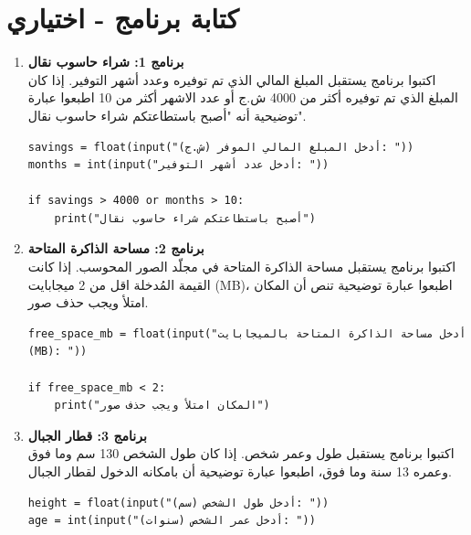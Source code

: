 \documentclass[14pt]{extarticle}
\begin{document}
\section*{كتابة برنامج - اختياري}
\begin{enumerate}[itemsep=3em]

\item \textbf{برنامج 1: شراء حاسوب نقال} \\
اكتبوا برنامج يستقبل المبلغ المالي الذي تم توفيره وعدد أشهر التوفير. إذا كان المبلغ الذي تم توفيره أكثر من 4000 ش.ج أو عدد الاشهر أكثر من 10 اطبعوا عبارة توضيحية أنه "أصبح باستطاعتكم شراء حاسوب نقال".

\ifwithsols
\begin{boxSolution}
\begin{english}
\begin{verbatim}
savings = float(input("أدخل المبلغ المالي الموفر (ش.ج): "))
months = int(input("أدخل عدد أشهر التوفير: "))

if savings > 4000 or months > 10:
    print("أصبح باستطاعتكم شراء حاسوب نقال")
\end{verbatim}
\end{english}
\end{boxSolution}
\fi

\item \textbf{برنامج 2: مساحة الذاكرة المتاحة} \\
اكتبوا برنامج يستقبل مساحة الذاكرة المتاحة في مجلّد الصور المحوسب. إذا كانت القيمة المُدخلة اقل من 2 ميجابايت (\textenglish{MB})، اطبعوا عبارة توضيحية تنص أن المكان امتلأ ويجب حذف صور.

\ifwithsols
\begin{boxSolution}
\begin{english}
\begin{verbatim}
free_space_mb = float(input("أدخل مساحة الذاكرة المتاحة بالميجابايت (MB): "))

if free_space_mb < 2:
    print("المكان امتلأ ويجب حذف صور")
\end{verbatim}
\end{english}
\end{boxSolution}
\fi

\item \textbf{برنامج 3: قطار الجبال} \\
اكتبوا برنامج يستقبل طول وعمر شخص. إذا كان طول الشخص 130 سم وما فوق وعمره 13 سنة وما فوق، اطبعوا عبارة توضيحية أن بامكانه الدخول لقطار الجبال.

\ifwithsols
\begin{boxSolution}
\begin{english}
\begin{verbatim}
height = float(input("أدخل طول الشخص (سم): "))
age = int(input("أدخل عمر الشخص (سنوات): "))


\end{verbatim}
\end{english}
\end{boxSolution}
\end{enumerate}
\end{document}
